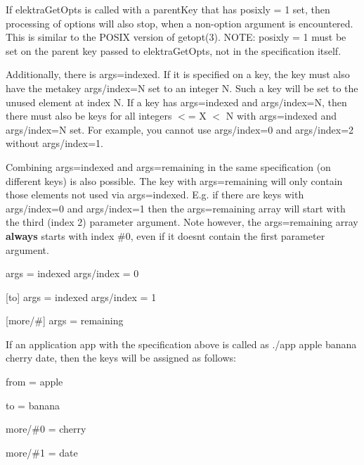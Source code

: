 If {\ttfamily elektra\+Get\+Opts} is called with a {\ttfamily parent\+Key} that has {\ttfamily posixly = 1} set, then processing of options will also stop, when a non-\/option argument is encountered. This is similar to the P\+O\+S\+IX version of getopt(3). N\+O\+TE\+: {\ttfamily posixly = 1} must be set on the parent key passed to {\ttfamily elektra\+Get\+Opts}, not in the specification itself.

Additionally, there is {\ttfamily args=indexed}. If it is specified on a key, the key must also have the metakey {\ttfamily args/index=N} set to an integer {\ttfamily N}. Such a key will be set to the unused element at index {\ttfamily N}. If a key has {\ttfamily args=indexed} and {\ttfamily args/index=N}, then there must also be keys for all integers { $<$= X $<$ N} with {\ttfamily args=indexed} and {\ttfamily args/index=N} set. For example, you cannot use {\ttfamily args/index=0} and {\ttfamily args/index=2} without {\ttfamily args/index=1}.

Combining {\ttfamily args=indexed} and {\ttfamily args=remaining} in the same specification (on different keys) is also possible. The key with {\ttfamily args=remaining} will only contain those elements not used via {\ttfamily args=indexed}. E.\+g. if there are keys with {\ttfamily args/index=0} and {\ttfamily args/index=1} then the {\ttfamily args=remaining} array will start with the third (index 2) parameter argument. Note however, the {\ttfamily args=remaining} array {\bfseries always} starts with index {\ttfamily \#0}, even if it doesn\textquotesingle{}t contain the first parameter argument.


\begin{DoxyCode}
[from]
args = indexed
args/index = 0

[to]
args = indexed
args/index = 1

[more/#]
args = remaining
\end{DoxyCode}


If an application {\ttfamily app} with the specification above is called as {\ttfamily ./app apple banana cherry date}, then the keys will be assigned as follows\+:


\begin{DoxyItemize}
\item {\ttfamily from = apple}
\item {\ttfamily to = banana}
\item {\ttfamily more/\#0 = cherry}
\item {\ttfamily more/\#1 = date}
\end{DoxyItemize}

